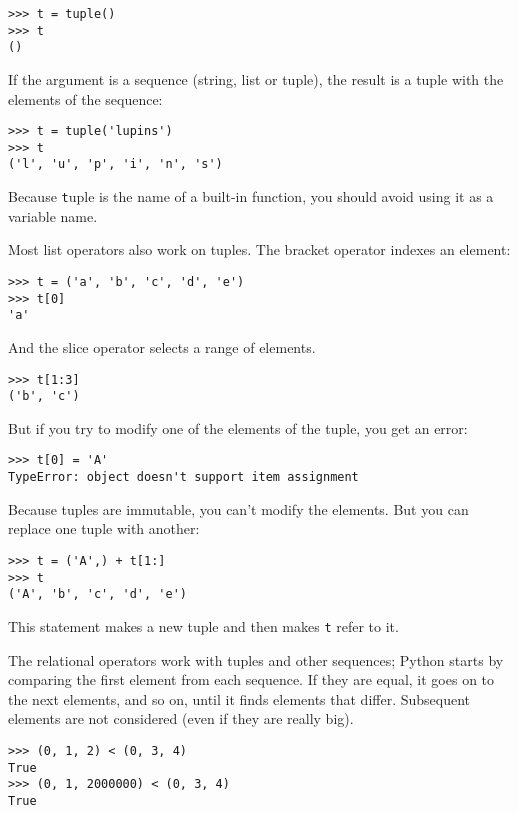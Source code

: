 \documentclass[
DIV=11,
fontsize=13,
twoside,
headinclude=false,
titlepage=firstiscover,
abstract=true,
headsepline=true,
footsepline=true,
chapterprefix=true, %
headings=big,
bibliography=totoc,%
captions=tableheading
]{scrbook}
\theoremstyle{definition}
\begin{document}
\begin{lstlisting}
>>> t = tuple()
>>> t
()
\end{lstlisting}
%
If the argument is a sequence (string, list or tuple), the result
is a tuple with the elements of the sequence:

\begin{lstlisting}
>>> t = tuple('lupins')
>>> t
('l', 'u', 'p', 'i', 'n', 's')
\end{lstlisting}
%
Because {\texttt tuple} is the name of a built-in function, you should
avoid using it as a variable name.

Most list operators also work on tuples.  The bracket operator
indexes an element:

\begin{lstlisting}
>>> t = ('a', 'b', 'c', 'd', 'e')
>>> t[0]
'a'
\end{lstlisting}
%
And the slice operator selects a range of elements.

\begin{lstlisting}
>>> t[1:3]
('b', 'c')
\end{lstlisting}
%
But if you try to modify one of the elements of the tuple, you get
an error:

\begin{lstlisting}
>>> t[0] = 'A'
TypeError: object doesn't support item assignment
\end{lstlisting}
%
Because tuples are immutable, you can't modify the elements.  But you
can replace one tuple with another:

\begin{lstlisting}
>>> t = ('A',) + t[1:]
>>> t
('A', 'b', 'c', 'd', 'e')
\end{lstlisting}
%
This statement makes a new tuple and then makes {\texttt t} refer to it.

The relational operators work with tuples and other sequences;
Python starts by comparing the first element from each
sequence.  If they are equal, it goes on to the next elements,
and so on, until it finds elements that differ.  Subsequent
elements are not considered (even if they are really big).

\begin{lstlisting}
>>> (0, 1, 2) < (0, 3, 4)
True
>>> (0, 1, 2000000) < (0, 3, 4)
True
\end{lstlisting}
\end{document}
